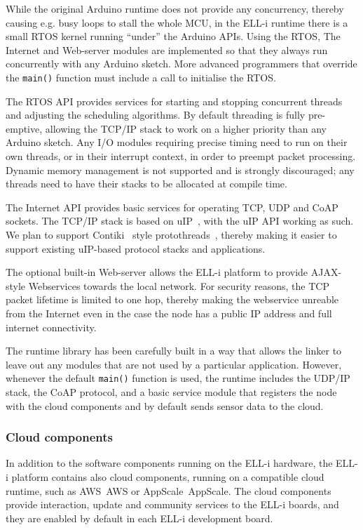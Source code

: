 \documentclass[draft,a4paper]{siamltex}
\begin{document}
While the original Arduino runtime does not provide any concurrency,
thereby causing e.g. busy loops to stall the whole MCU, in the ELL-i
runtime there is a small RTOS kernel running ``under'' the Arduino
APIs.  Using the RTOS, The Internet and Web-server modules are
implemented so that they always run concurrently with any Arduino
sketch.  More advanced programmers that override the \hbox{\tt main()}
function must include a call to initialise the RTOS.

The RTOS API provides services for starting and stopping concurrent
threads and adjusting the scheduling algorithms.  By default threading
is fully pre-emptive, allowing the TCP/IP stack to work on a higher
priority than any Arduino sketch.  Any I/O modules requiring precise
timing need to run on their own threads, or in their interrupt
context, in order to preempt packet processing.  Dynamic memory
management is not supported and is strongly discouraged; any threads
need to have their stacks to be allocated at compile time.

The Internet API provides basic services for operating TCP, UDP and
CoAP\cite{CoAP} sockets.  The TCP/IP stack is based on
uIP~\cite{uIP}, with the
uIP API working as such.  We plan to support Contiki~\cite{Contiki}
style protothreads~\cite{protothreads}, thereby making it easier to
support existing uIP-based protocol stacks and applications.

The optional built-in Web-server allows the ELL-i platform to provide
AJAX-style Webservices towards the local network.  For security
reasons, the TCP packet lifetime is limited to one hop, thereby making
the webservice unreable from the Internet even in the case the node
has a public IP address and full internet connectivity.

The runtime library has been carefully built in a way that allows the
linker to leave out any modules that are not used by a particular
application.  However, whenever the default \hbox{\tt main()} function
is used, the runtime includes the UDP/IP stack, the CoAP protocol, and
a basic service module that registers the node with the cloud
components and by default sends sensor data to the cloud.

\subsubsection{Cloud components}

In addition to the software components running on the ELL-i hardware,
the ELL-i platform contains also cloud components, running on a
compatible cloud runtime, such as AWS~{AWS} or AppScale~{AppScale}.
The cloud components provide interaction, update and community
services to the ELL-i boards, and they are enabled by default in each
ELL-i development board.
\end{document}
